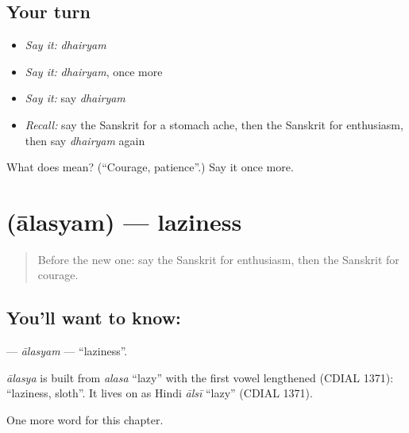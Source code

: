 \subsection*{Your turn}
\begin{itemize}
\raggedright
  \item \emph{Say it:} \emph{dhairyam}
  \item \emph{Say it:} \emph{dhairyam}, once more
  \item \emph{Say it:} say \emph{dhairyam}
  \item \emph{Recall:} say the Sanskrit for a stomach ache, then the Sanskrit for enthusiasm, then say \emph{dhairyam} again
\end{itemize}

\begin{tcolorbox}[breakable,colback=teal!4,colframe=teal!35!black,title={Before you move on}]
What does  mean? (\textquotedblleft{}Courage, patience\textquotedblright{}.) Say it once more.
\end{tcolorbox}
\section[\texorpdfstring{\sk{आलस्यम्} (ālasyam)}{आलस्यम् (ālasyam)}]{ (ālasyam) — laziness}

\label{lesson:SA-C151-alasyam}



\begin{quote}
Before the new one: say the Sanskrit for enthusiasm, then the Sanskrit for courage.
\end{quote}

\subsection*{You'll want to know: }
\textbf{} — \emph{ālasyam} — \textquotedblleft{}laziness\textquotedblright{}.

\begin{cousinweb}
\emph{ālasya} is built from \emph{alasa} \textquotedblleft{}lazy\textquotedblright{} with the first vowel lengthened (CDIAL 1371): \textquotedblleft{}laziness, sloth\textquotedblright{}. It lives on as Hindi \emph{ālsī} \textquotedblleft{}lazy\textquotedblright{} (CDIAL 1371).
\end{cousinweb}

\begin{grammarlens}[title={What you've built}]
One more word for this chapter.
\end{grammarlens}

